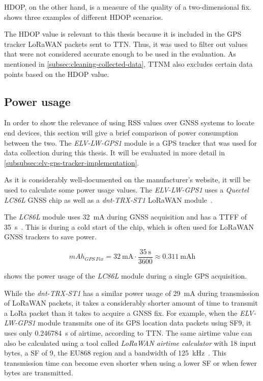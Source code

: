 \ac{HDOP}, on the other hand, is a measure of the quality of a two-dimensional fix.
 shows three examples of different \ac{HDOP} scenarios.

The \ac{HDOP} value is relevant to this thesis because it is included in the \ac{GPS} tracker \ac{LoRaWAN} packets sent to \ac{TTN}.
Thus, it was used to filter out values that were not considered accurate enough to be used in the evaluation.
As mentioned in \cref{subsec:cleaning-collected-data}, \ac{TTNM} also excludes certain data points based on the \ac{HDOP} value.

\subsection{Power usage}\label{subsec:gnss-power-usage}

In order to show the relevance of using \ac{RSS} values over \ac{GNSS} systems to locate end devices, this section will give a brief comparison of power consumption between the two.
The \emph{ELV-LW-GPS1} module is a \ac{GPS} tracker that was used for data collection during this thesis.
It will be evaluated in more detail in \cref{subsubsec:elv-gps-tracker-implementation}.

As it is considerably well-documented on the manufacturer's website, it will be used to calculate some power usage values.
The \emph{ELV-LW-GPS1} uses a \emph{Quectel LC86L} \ac{GNSS} chip as well as a \emph{dnt-TRX-ST1} \ac{LoRaWAN} module~\cite{elv_elektronik_ag_elv_2023}.

The \emph{LC86L} module uses \SI{32}{\milli\ampere} during \ac{GNSS} acquisition and has a \ac{TTFF} of \SI{35}{\second}~\cite{quectel_gnss_nodate}.
This is during a cold start of the chip, which is often used for \ac{LoRaWAN} \ac{GNSS} trackers to save power.

\begin{equation}\label{eq:LC86L-fix-consumption}
    mAh_{GPS\,Fix} = \SI{32}{\milli\ampere} \cdot \frac{\SI{35}{\second}}{3600} \approx \SI{0.311}{\milli\ampere\hour}
\end{equation}

 shows the power usage of the \emph{LC86L} module during a single \ac{GPS} acquisition.

While the \emph{dnt-TRX-ST1} has a similar power usage of \SI{29}{\milli\ampere} during transmission of \ac{LoRaWAN} packets, it takes a considerably shorter amount of time to transmit a \ac{LoRa} packet than it takes to acquire a \ac{GNSS} fix.
For example, when the \emph{ELV-LW-GPS1} module transmits one of its \ac{GPS} location data packets using \ac{SF}9, it uses only \SI{0.246784}{\second} of airtime, according to \ac{TTN}.
The same airtime value can also be calculated using a tool called \emph{\ac{LoRaWAN} airtime calculator} with 18 input bytes, a \ac{SF} of 9, the EU868 region and a bandwidth of \SI{125}{\kilo\hertz}~\cite{the_things_network_lorawan_nodate}.
This transmission time can become even shorter when using a lower \ac{SF} or when fewer bytes are transmitted.


